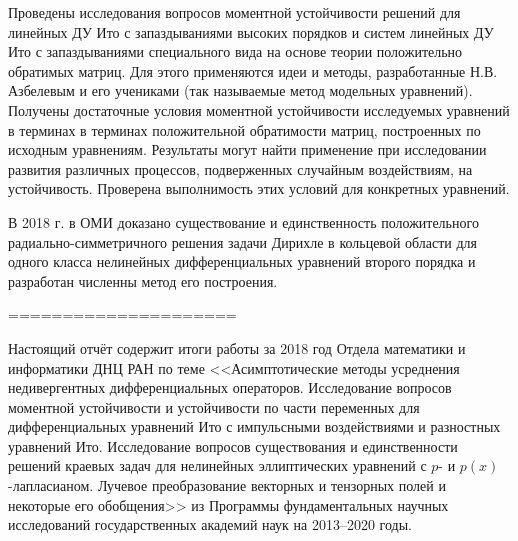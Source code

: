 Проведены исследования вопросов моментной устойчивости решений для линейных ДУ Ито с
запаздываниями высоких порядков и систем линейных ДУ Ито с запаздываниями специального вида на
основе теории положительно обратимых матриц. Для этого применяются идеи и методы, разработанные Н.В. Азбелевым и его
учениками (так называемые метод модельных уравнений). 
Получены достаточные условия моментной устойчивости исследуемых уравнений в терминах в терминах положительной обратимости матриц, построенных по исходным уравнениям.
Результаты могут найти применение при исследовании развития различных процессов, подверженных случайным воздействиям, на  устойчивость. 
Проверена выполнимость этих условий для конкретных уравнений. 








В 2018 г. в ОМИ доказано существование и единственность положительного радиально-симметричного решения задачи Дирихле в кольцевой области для одного класса нелинейных дифференциальных уравнений второго порядка и разработан численны метод его построения.














\newpage

=====================








Настоящий отчёт содержит итоги работы за 2018 год Отдела математики и информатики ДНЦ РАН по теме
<<Асимптотические методы усреднения недивергентных дифференциальных операторов. Исследование вопросов моментной устойчивости и устойчивости по части переменных для дифференциальных уравнений Ито с импульсными воздействиями и разностных уравнений Ито. Исследование вопросов существования и единственности решений краевых задач для нелинейных эллиптических уравнений с $p$- и $p(x)$-лапласианом. Лучевое преобразование векторных и тензорных полей и некоторые его обобщения>>
из Программы фундаментальных научных исследований государственных академий наук на 2013–2020 годы.




